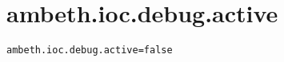 \section{ambeth.ioc.debug.active}
\label{configuration:AmbethIocDebugActive}
\ClearAPI
\TODO
{}
\begin{lstlisting}[style=Props,caption={Usage example for \textit{ambeth.ioc.debug.active}}]
ambeth.ioc.debug.active=false
\end{lstlisting}